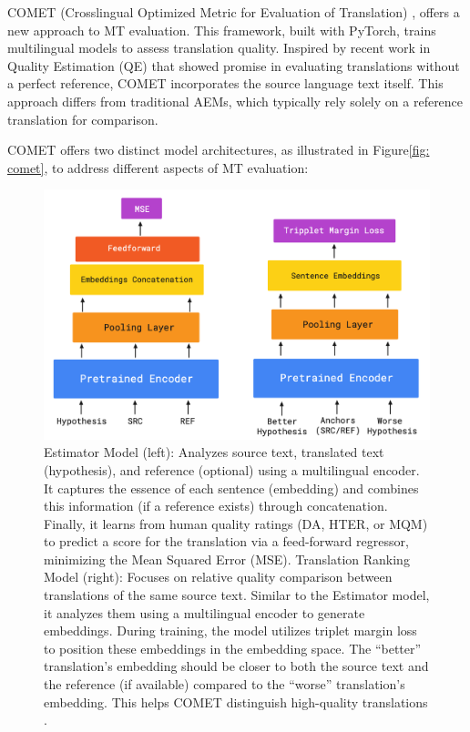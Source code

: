{{COMET (Crosslingual Optimized Metric for Evaluation of Translation) \parencite{rei-etal-2020-comet}, offers a new approach to MT evaluation. This framework, built with PyTorch, trains multilingual models to assess translation quality. Inspired by recent work in Quality Estimation (QE) that showed promise in evaluating translations without a perfect reference, COMET incorporates the source language text itself. This approach differs from traditional AEMs, which typically rely solely on a reference translation for comparison.

COMET offers two distinct model architectures, as illustrated in Figure\ref{fig: comet}, to address different aspects of MT evaluation:

\begin{figure}[htb]
\centering
\includegraphics[width=.8\textwidth]{textual/Figuras/comett.png}
\caption{Estimator Model (left): Analyzes source text, translated text (hypothesis), and reference (optional) using a multilingual encoder. It captures the essence of each sentence (embedding) and combines this information (if a reference exists) through concatenation. Finally, it learns from human quality ratings (DA, HTER, or MQM) to predict a score for the translation via a feed-forward regressor, minimizing the Mean Squared Error (MSE). Translation Ranking Model (right): Focuses on relative quality comparison between translations of the same source text. Similar to the Estimator model, it analyzes them using a multilingual encoder to generate embeddings. During training, the model utilizes triplet margin loss to position these embeddings in the embedding space. The ``better'' translation's embedding should be closer to both the source text and the reference (if available) compared to the ``worse'' translation's embedding. This helps COMET distinguish high-quality translations \parencite{rei-etal-2020-comet}.}



\end{figure}}}
